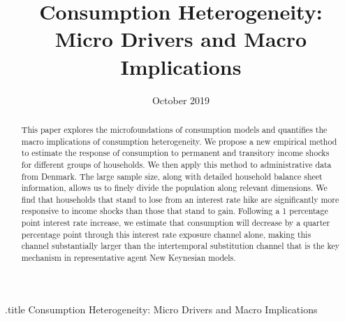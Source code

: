 \documentclass[titlepage]{\econtex}\newcommand{\texname}{ConsumptionHeterogeneity}
\begin{document}


%
\begin{verbatimwrite}{\jobname.title}
Consumption Heterogeneity: Micro Drivers and Macro Implications
\end{verbatimwrite}


\title{ 
	\bigskip
	\bigskip
	Consumption Heterogeneity: \\ Micro Drivers and Macro Implications}



\date{October 2019}
\maketitle


\begin{abstract}
	This paper explores the microfoundations of consumption models and quantifies the macro implications of consumption heterogeneity. We propose a new empirical method to estimate the response of consumption to permanent and transitory income shocks for different groups of households. We then apply this method to administrative data from Denmark. The large sample size, along with detailed household balance sheet information, allows us to finely divide the population along relevant dimensions. We find that households that stand to lose from an interest rate hike are significantly more responsive to income shocks than those that stand to gain. Following a 1 percentage point interest rate increase, we estimate that consumption will decrease by a quarter percentage point through this interest rate exposure channel alone, making this channel substantially larger than the intertemporal substitution channel that is the key mechanism in representative agent New Keynesian models.
%  
\end{abstract}
\end{document}
